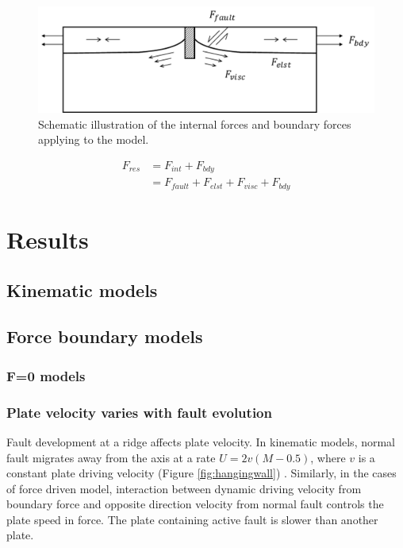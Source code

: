 \documentclass[letterpaper,12pt,notitle]{memphisthesis}                     %
\begin{document}
\begin{figure}[!htb]
	\centering
	\includegraphics[width=0.9\linewidth]{./figs/force.pdf}
	\caption{ Schematic illustration of the internal forces and boundary forces applying to the model.}
	\label{fig:forcescheme}
\end{figure}
\begin{align} \label{Fres}
F_{res} & = F_{int} + F_{bdy} \\
 & = F_{fault} + F_{elst} + F_{visc} + F_{bdy}
\end{align}

\chapter{Results}

\section{Kinematic models}


\section{Force boundary models}

\subsection{F=0 models}

\subsection{Plate velocity varies with fault evolution}

Fault development at a ridge affects plate velocity. In kinematic models, normal fault migrates away from the axis at a rate $U = 2v(M-0.5)$, where $v$ is a constant plate driving velocity (Figure \ref{fig:hangingwall}) \citep{Buck2005}. Similarly, in the cases of force driven model, interaction between dynamic driving velocity from boundary force and opposite direction velocity from normal fault controls the plate speed in force. The plate containing active fault is slower than another plate.
\end{document}
